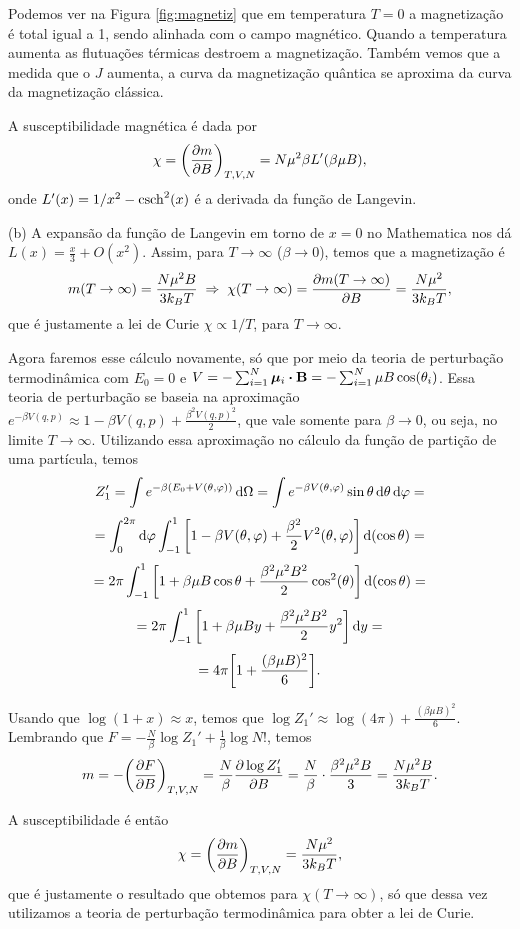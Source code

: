 \documentclass[a4paper,10pt]{article}
\begin{document}
Podemos ver na Figura \ref{fig:magnetiz} que em temperatura $T = 0$ a magnetização é total igual a 1, sendo alinhada com o campo magnético. Quando a temperatura aumenta as flutuações térmicas destroem a magnetização. Também vemos que a medida que o $J$ aumenta, a curva da magnetização quântica se aproxima da curva da magnetização clássica.

\n

A susceptibilidade magnética é dada por
$$
\chi = \qty(\pdv{m}{B})_{T,V,N} = N \mu^2 \beta L'(\beta \mu B),
$$
onde $L'(x) = 1/x^2 - \csch[2](x)$ é a derivada da função de Langevin.

\n\n

(b) A expansão da função de Langevin em torno de $x = 0$ no Mathematica nos dá $L(x) = \frac{x}{3} + O(x^2)$. Assim, para $T \to \infty$ ($\beta \to 0$), temos que a magnetização é
$$
m(T \to \infty) = \frac{N \mu^2 B}{3 k_B T} \; \Rightarrow \; \chi(T\to\infty) = \pdv{m(T\to\infty)}{B} = \frac{N\mu^2}{3 k_B T},
$$
que é justamente a lei de Curie $\chi \propto 1/T$, para $T \to \infty$.

\n

Agora faremos esse cálculo novamente, só que por meio da teoria de perturbação termodinâmica com $E_0 = 0$ e $V = -\sum_{i=1}^{N} \bm{\mu}_i \vdot \B = - \sum_{i=1}^{N} \mu B \cos(\theta_i)$. Essa teoria de perturbação se baseia na aproximação $e^{-\beta V(q,p)} \approx 1 - \beta V(q,p) + \frac{\beta^2 V(q,p)^2}{2}$, que vale somente para $\beta \to 0$, ou seja, no limite $T \to \infty$. Utilizando essa aproximação no cálculo da função de partição de uma partícula, temos
$$
Z_1' = \int e^{-\beta (E_0 + V(\theta,\varphi))} \dd{\Omega} = \int e^{-\beta V(\theta,\varphi)} \sin\theta \dd{\theta} \dd{\varphi} =
$$
$$
= \int_0^{2\pi} \dd{\varphi} \int_{-1}^{1} \qty[1 - \beta V(\theta,\varphi) + \frac{\beta^2}{2} V^2(\theta,\varphi)] \dd{(\cos\theta)} =
$$
$$
= 2\pi \int_{-1}^{1} \qty[1 + \beta \mu B \cos\theta + \frac{\beta^2\mu^2B^2}{2} \cos[2](\theta)] \dd{(\cos\theta)} =
$$
$$
= 2\pi \int_{-1}^{1} \qty[1 + \beta \mu B y + \frac{\beta^2\mu^2B^2}{2} y^2] \dd{y} =
$$
$$
= 4\pi \qty[1 + \frac{(\beta\mu B)^2}{6}].
$$

Usando que $\log(1+x) \approx x$, temos que $\log Z_1' \approx \log(4\pi) + \frac{(\beta\mu B)^2}{6}$. Lembrando que $F = -\frac{N}{\beta} \log Z_1' + \frac{1}{\beta} \log N!$, temos
$$
m = -\qty(\pdv{F}{B})_{T,V,N} = \frac{N}{\beta} \pdv{\log Z_1'}{B} = \frac{N}{\beta} \cdot \frac{\beta^2\mu^2 B}{3} =
\frac{N\mu^2 B}{3 k_B T}.
$$

A susceptibilidade é então
$$
\chi = \qty(\pdv{m}{B})_{T,V,N} = \frac{N\mu^2}{3 k_B T},
$$
que é justamente o resultado que obtemos para $\chi(T \to \infty)$, só que dessa vez utilizamos a teoria de perturbação termodinâmica para obter a lei de Curie.
\end{document}
